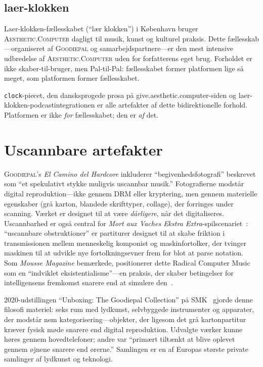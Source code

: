 \documentclass[10pt,letterpaper,twocolumn]{article}
\newcommand{\ac}{\textsc{Aesthetic.Computer}}
\newcommand{\gp}{\textsc{Goodiepal}}
\begin{document}
\subsection{laer-klokken}

Laer-klokken-fællesskabet (``lær klokken'') i København bruger \ac{} dagligt til musik, kunst og kulturel praksis. Dette fællesskab---organiseret af \gp{} og samarbejdspartnere---er den mest intensive udbredelse af \ac{} uden for forfatterens eget brug. Forholdet er ikke skaber-til-bruger, men Pal-til-Pal: fællesskabet former platformen lige så meget, som platformen former fællesskabet.

\texttt{clock}-piecet, den dansksprogede prosa på give.aesthetic.computer-siden og laer-klokken-podcastintegrationen er alle artefakter af dette bidirektionelle forhold. Platformen er ikke \emph{for} fællesskabet; den er \emph{af} det.

\section{Uscannbare artefakter}

\gp{}'s \emph{El Camino del Hardcore} inkluderer ``begivenhedsfotografi'' beskrevet som ``et spekulativt stykke muligvis uscannbar musik.'' Fotografierne modstår digital reproduktion---ikke gennem DRM eller kryptering, men gennem materielle egenskaber (grå karton, blandede skrifttyper, collage), der forringes under scanning. Værket er designet til at være \emph{dårligere}, når det digitaliseres. Uscannbarhed er også central for \emph{Mort aux Vaches Ekstra Extra}-spilscenariet~\citep{goodiepal2007mortauxvaches}: ``uscannbare obstruktioner'' er partiturer designet til at skabe friktion i transmissionen mellem menneskelig komponist og maskinfortolker, der tvinger maskinen til at udvikle nye fortolkningsevner frem for blot at parse notation. Som \emph{Mousse Magazine} bemærkede, positionerer dette Radical Computer Music som en ``indviklet eksistentialisme''---en praksis, der skaber betingelser for intelligensens fremkomst snarere end at simulere den~\citep{mousse2018goodiepal}.

2020-udstillingen ``Unboxing: The Goodiepal Collection'' på SMK~\citep{smk2020unboxing} gjorde denne filosofi materiel: seks rum med lydkunst, selvbyggede instrumenter og apparater, der modstår nem kategorisering---objekter, der ligesom det grå kartonpartitur kræver fysisk møde snarere end digital reproduktion. Udvalgte værker kunne høres gennem hovedtelefoner; andre var ``primært tiltænkt at blive oplevet gennem øjnene snarere end ørerne.'' Samlingen er en af Europas største private samlinger af lydkunst og teknologi.
\end{document}
